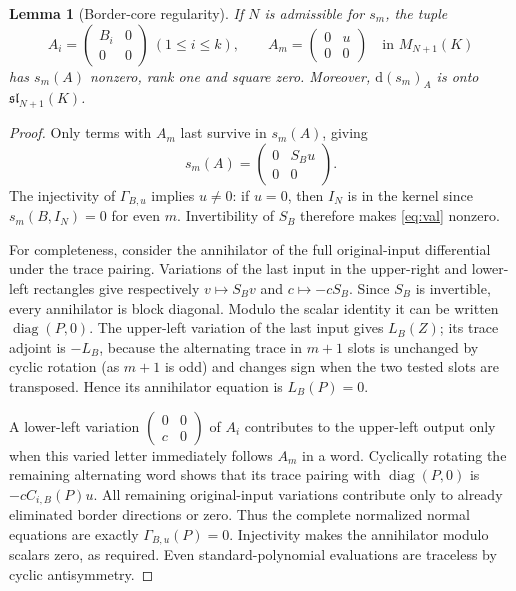 \documentclass[11pt,reqno]{amsart}
\newcommand{\dd}{\mathrm d}
\theoremstyle{plain}
\newtheorem{lemma}[theorem]{Lemma}
\theoremstyle{definition}
\numberwithin{equation}{section}
\begin{document}
\begin{lemma}[Border-core regularity]\label{lem:core}
If $N$ is admissible for $s_m$, the tuple
\begin{equation}\label{eq:frame}
 A_i=\begin{pmatrix}B_i&0\\0&0\end{pmatrix}\ (1\le i\le k),\qquad
 A_m=\begin{pmatrix}0&u\\0&0\end{pmatrix}\quad \text{in }M_{N+1}(K)
\end{equation}
has $s_m(A)$ nonzero, rank one and square zero.  Moreover, $\dd(s_m)_A$ is onto $\mathfrak{sl}_{N+1}(K)$.
\end{lemma}
\begin{proof}
Only terms with $A_m$ last survive in $s_m(A)$, giving
\begin{equation}\label{eq:val}
 s_m(A)=\begin{pmatrix}0&S_Bu\\0&0\end{pmatrix}.
\end{equation}
The injectivity of $\Gamma_{B,u}$ implies $u\ne0$: if $u=0$, then $I_N$ is in the kernel since $s_m(B,I_N)=0$ for even $m$.  Invertibility of $S_B$ therefore makes \eqref{eq:val} nonzero.

For completeness, consider the annihilator of the full original-input differential under the trace pairing.  Variations of the last input in the upper-right and lower-left rectangles give respectively $v\mapsto S_Bv$ and $c\mapsto -cS_B$.  Since $S_B$ is invertible, every annihilator is block diagonal.  Modulo the scalar identity it can be written $\operatorname{diag}(P,0)$.  The upper-left variation of the last input gives $L_B(Z)$; its trace adjoint is $-L_B$, because the alternating trace in $m+1$ slots is unchanged by cyclic rotation (as $m+1$ is odd) and changes sign when the two tested slots are transposed.  Hence its annihilator equation is $L_B(P)=0$.

A lower-left variation $\left(\begin{smallmatrix}0&0\\c&0\end{smallmatrix}\right)$ of $A_i$ contributes to the upper-left output only when this varied letter immediately follows $A_m$ in a word.  Cyclically rotating the remaining alternating word shows that its trace pairing with $\operatorname{diag}(P,0)$ is $-cC_{i,B}(P)u$.  All remaining original-input variations contribute only to already eliminated border directions or zero.  Thus the complete normalized normal equations are exactly $\Gamma_{B,u}(P)=0$.  Injectivity makes the annihilator modulo scalars zero, as required.  Even standard-polynomial evaluations are traceless by cyclic antisymmetry.
\end{proof}
\end{document}
